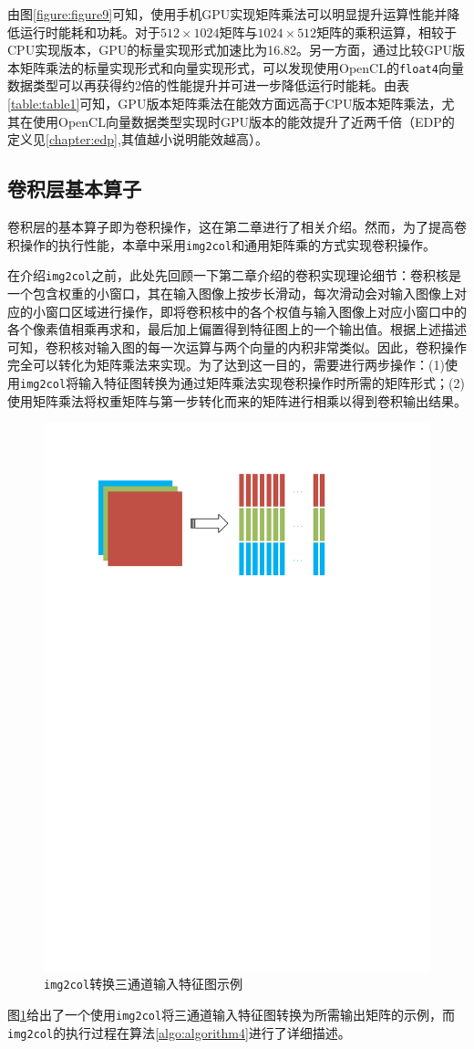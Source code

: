 由图\ref{figure:figure9}可知，使用手机GPU实现矩阵乘法可以明显提升运算性能并降低运行时能耗和功耗。对于$512\times1024$矩阵与$1024\times512$矩阵的乘积运算，相较于CPU实现版本，GPU的标量实现形式加速比为16.82。另一方面，通过比较GPU版本矩阵乘法的标量实现形式和向量实现形式，可以发现使用OpenCL的\texttt{float4}向量数据类型可以再获得约2倍的性能提升并可进一步降低运行时能耗。由表\ref{table:table1}可知，GPU版本矩阵乘法在能效方面远高于CPU版本矩阵乘法，尤其在使用OpenCL向量数据类型实现时GPU版本的能效提升了近两千倍（EDP的定义见\ref{chapter:edp},其值越小说明能效越高）。

\subsection{卷积层基本算子}

卷积层的基本算子即为卷积操作，这在第二章进行了相关介绍。然而，为了提高卷积操作的执行性能，本章中采用\texttt{img2col}和通用矩阵乘的方式实现卷积操作。

在介绍\texttt{img2col}之前，此处先回顾一下第二章介绍的卷积实现理论细节：卷积核是一个包含权重的小窗口，其在输入图像上按步长滑动，每次滑动会对输入图像上对应的小窗口区域进行操作，即将卷积核中的各个权值与输入图像上对应小窗口中的各个像素值相乘再求和，最后加上偏置得到特征图上的一个输出值。根据上述描述可知，卷积核对输入图的每一次运算与两个向量的内积非常类似。因此，卷积操作完全可以转化为矩阵乘法来实现。为了达到这一目的，需要进行两步操作：(1)使用\texttt{img2col}将输入特征图转换为通过矩阵乘法实现卷积操作时所需的矩阵形式；(2)使用矩阵乘法将权重矩阵与第一步转化而来的矩阵进行相乘以得到卷积输出结果。

\begin{figure}[htb]
    \begin{center}
    \includegraphics[height=0.3\textwidth]{figures/im2col.pdf}
    \end{center}
    \caption{\texttt{img2col}转换三通道输入特征图示例}\label{figure:figure10}
\end{figure}

图\ref{figure:figure10}给出了一个使用\texttt{img2col}将三通道输入特征图转换为所需输出矩阵的示例，而\texttt{img2col}的执行过程在算法\ref{algo:algorithm4}进行了详细描述。


